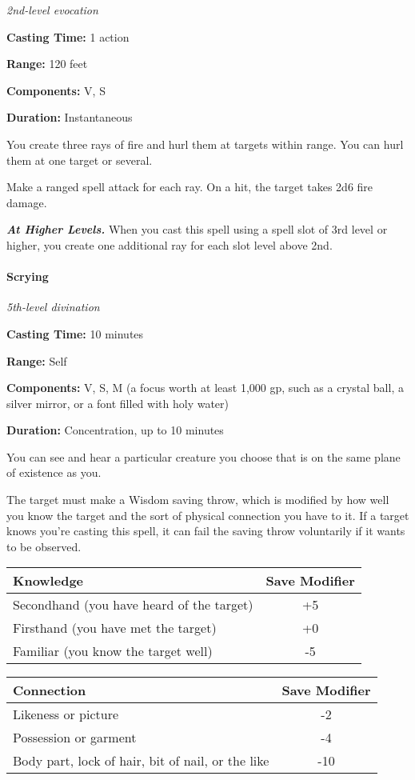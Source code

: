 \documentclass[
]{article}
\begin{document}
\emph{2nd-level evocation}

\textbf{Casting Time:} 1 action

\textbf{Range:} 120 feet

\textbf{Components:} V, S

\textbf{Duration:} Instantaneous

You create three rays of fire and hurl them at targets within range. You
can hurl them at one target or several.

Make a ranged spell attack for each ray. On a hit, the target takes 2d6
fire damage.

\emph{\textbf{At Higher Levels.}} When you cast this spell using a spell
slot of 3rd level or higher, you create one additional ray for each slot
level above 2nd.

\hypertarget{scrying}{%
\paragraph{Scrying}\label{scrying}}

\emph{5th-level divination}

\textbf{Casting Time:} 10 minutes

\textbf{Range:} Self

\textbf{Components:} V, S, M (a focus worth at least 1,000 gp, such as a
crystal ball, a silver mirror, or a font filled with holy water)

\textbf{Duration:} Concentration, up to 10 minutes

You can see and hear a particular creature you choose that is on the
same plane of existence as you.

The target must make a Wisdom saving throw, which is modified by how
well you know the target and the sort of physical connection you have to
it. If a target knows you're casting this spell, it can fail the saving
throw voluntarily if it wants to be observed.

\begin{longtable}[]{@{}lc@{}}
\toprule
Knowledge & Save Modifier\tabularnewline
\midrule
\endhead
Secondhand (you have heard of the target) & +5\tabularnewline
Firsthand (you have met the target) & +0\tabularnewline
Familiar (you know the target well) & -5\tabularnewline
\bottomrule
\end{longtable}

\begin{longtable}[]{@{}lc@{}}
\toprule
Connection & Save Modifier\tabularnewline
\midrule
\endhead
Likeness or picture & -2\tabularnewline
Possession or garment & -4\tabularnewline
Body part, lock of hair, bit of nail, or the like & -10\tabularnewline
\bottomrule
\end{longtable}
\end{document}
